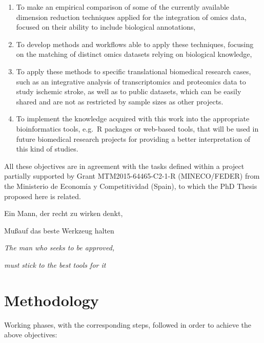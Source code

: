\documentclass[a4paper, nobind]{templates/ociamthesis}
\renewcommand{\chaptermark}[1]{\markboth{\thechapter. #1}{\thechapter. #1}}
\begin{document}
\begin{enumerate}
\def\labelenumi{\arabic{enumi}.}
\item
  To make an empirical comparison of some of the currently available dimension reduction techniques applied for the integration of omics data, focused on their ability to include biological annotations,
\item
  To develop methods and workflows able to apply these techniques, focusing on the matching of distinct omics datasets relying on biological knowledge,
\item
  To apply these methods to specific translational biomedical research cases, such as an integrative analysis of transcriptomics and proteomics data to study ischemic stroke, as well as to public datasets, which can be easily shared and are not as restricted by sample sizes as other projects.
\item
  To implement the knowledge acquired with this work into the appropriate bioinformatics tools, e.g.~R packages or web-based tools, that will be used in future biomedical research projects for providing a better interpretation of this kind of studies.
\end{enumerate}

\begin{small}All these objectives are in agreement with the tasks defined within a project partially supported by Grant MTM2015-64465-C2-1-R (MINECO/FEDER) from the Ministerio de Economía y Competitividad (Spain), to which the PhD Thesis proposed here is related.\end{small}

\begin{savequote}
Ein Mann, der recht zu wirken denkt,

Mu\ss\enspace auf das beste Werkzeug halten

\emph{The man who seeks to be approved,}

\emph{must stick to the best tools for it}
\end{savequote}



\hypertarget{methods}{%
\chapter{Methodology}\label{methods}}

\chaptermark{Methodology}

\minitoc 

Working phases, with the corresponding steps, followed in order to achieve the above objectives:
\end{document}
